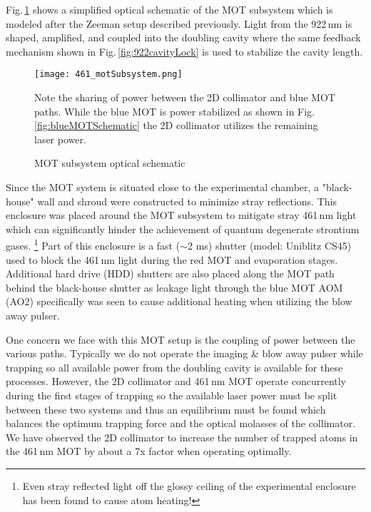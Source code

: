 Fig.\,\ref{fig:motSchematic} shows a simplified optical schematic of the MOT subsystem which is modeled after the Zeeman setup described previously.
Light from the 922\,nm is shaped, amplified, and coupled into the doubling cavity where the same feedback mechanism shown in Fig.\,\ref{fig:922cavityLock} is used to stabilize the cavity length.
	\begin{figure} 
		\centerline{
		\texttt{[image: 461\_motSubsystem.png]}}
		\caption{MOT subsystem optical schematic}{Note the sharing of power between the 2D collimator and blue MOT paths. While the blue MOT is power stabilized as shown in Fig.\,\ref{fig:blueMOTSchematic} the 2D collimator utilizes the remaining laser power.}
		\label{fig:motSchematic}
	\end{figure}
Since the MOT system is situated close to the experimental chamber, a "black-house" wall and shroud were constructed to minimize stray reflections.
This enclosure was placed around the MOT subsystem to mitigate stray 461\,nm light which can significantly hinder the achievement of quantum degenerate strontium gases.
\footnote{Even stray reflected light off the glossy ceiling of the experimental enclosure has been found to cause atom heating!}
Part of this enclosure is a fast ($\sim$2 ms) shutter (model: Uniblitz CS45) used to block the 461\,nm light during the red MOT and evaporation stages.
Additional hard drive (HDD) shutters are also placed along the MOT path behind the black-house shutter as leakage light through the blue MOT AOM (AO2) specifically was seen to cause additional heating when utilizing the blow away pulser.

One concern we face with this MOT setup is the coupling of power between the various paths.
Typically we do not operate the imaging \& blow away pulser while trapping so all available power from the doubling cavity is available for these processes.
However, the 2D collimator and 461\,nm MOT operate concurrently during the first stages of trapping so the available laser power must be split between these two systems and thus an equilibrium must be found which balances the optimum trapping force and the optical molasses of the collimator.
We have observed the 2D collimator to increase the number of trapped atoms in the 461\,nm MOT by about a 7x factor when operating optimally.

